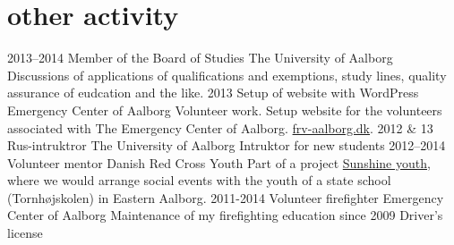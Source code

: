 \documentclass[print]{friggeri-cv}
\begin{document}
\section{other activity}

\begin{entrylist}
  \entry
  {2013–2014}
  {Member of the Board of Studies}
  {The University of Aalborg}
  {Discussions of applications of qualifications and exemptions, study lines, quality assurance of eudcation and the like.}
  \entry
  {2013}
  {Setup of website with WordPress}
  {Emergency Center of Aalborg}
  {Volunteer work. Setup website for the volunteers associated with The Emergency Center of Aalborg.
  \href{http://frv-aalborg.dk}{frv-aalborg.dk}.}
  \entry
  {2012 \& 13}
  {Rus-intruktror}
  {The University of Aalborg}
  {Intruktor for new students}
  \entry
  {2012–2014}
  {Volunteer mentor}
  {Danish Red Cross Youth}
  {Part of a project \href{http://www.urk.dk/solskinsunge/}{Sunshine youth}, where we would arrange social events with the youth of a state school (Tornhøjskolen) in Eastern Aalborg.}
  \entry
  {2011-2014}
  {Volunteer firefighter}
  {Emergency Center of Aalborg}
  {Maintenance of my firefighting education}
  \entry
  {since 2009}
  {Driver's license}
  {}{}
\end{entrylist}
\end{document}
